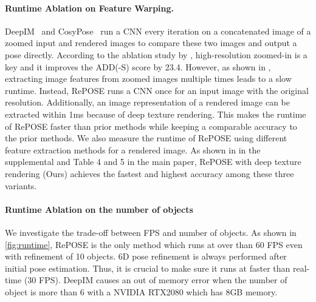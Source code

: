 \documentclass[10pt,twocolumn,letterpaper]{article}
\begin{document}
\paragraph{Runtime Ablation on Feature Warping.}
DeepIM~\cite{li2018deepim} and CosyPose~\cite{labbe2020} run a CNN every iteration on a concatenated image of a zoomed input and rendered images to compare these two images and output a pose directly.
According to the ablation study by \cite{li2018deepim}, high-resolution zoomed-in is a key and it improves the ADD(-S) score by 23.4. 
However, as shown in , extracting image features from zoomed images multiple times leads to a slow runtime.
Instead, RePOSE runs a CNN once for an input image with the original resolution. Additionally, an image representation of a rendered image can be extracted within 1ms because of deep texture rendering. This makes the runtime of RePOSE faster than prior methods while keeping a comparable accuracy to the prior methods.
We also measure the runtime of RePOSE using different feature extraction methods for a rendered image.
As shown in  in the supplemental and Table 4 and 5 in the main paper, RePOSE with deep texture rendering (Ours) achieves the fastest and highest accuracy among these three variants.


\paragraph{Runtime Ablation on the number of objects}
We investigate the trade-off between FPS and number of objects.
As shown in \ref{fig:runtime}, RePOSE is the only method which runs at over than 60 FPS even with refinement of 10 objects. 6D pose refinement is always performed after initial pose estimation. Thus, it is crucial to make sure it runs at faster than real-time (30 FPS). DeepIM causes an out of memory error when the number of object is more than 6 with a NVIDIA RTX2080 which has 8GB memory.
\end{document}

